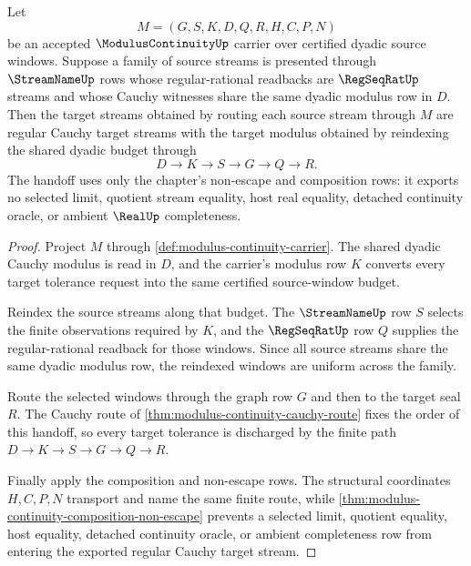 \begin{theorem}
\label{thm:modulus-continuity-uniform-cauchy-handoff}
Let
$$
M=(G,S,K,D,Q,R,H,C,P,N)
$$
be an accepted $\ModulusContinuityUp$ carrier over certified dyadic source windows. Suppose a family of source streams is presented through $\StreamNameUp$ rows whose regular-rational readbacks are $\RegSeqRatUp$ streams and whose Cauchy witnesses share the same dyadic modulus row in $D$. Then the target streams obtained by routing each source stream through $M$ are regular Cauchy target streams with the target modulus obtained by reindexing the shared dyadic budget through
$$
D \to K \to S \to G \to Q \to R .
$$
The handoff uses only the chapter's non-escape and composition rows: it exports no selected limit, quotient stream equality, host real equality, detached continuity oracle, or ambient $\RealUp$ completeness.
\end{theorem}
\begin{proof}
Project $M$ through \autoref{def:modulus-continuity-carrier}. The shared dyadic Cauchy modulus is read in $D$, and the carrier's modulus row $K$ converts every target tolerance request into the same certified source-window budget.

Reindex the source streams along that budget. The $\StreamNameUp$ row $S$ selects the finite observations required by $K$, and the $\RegSeqRatUp$ row $Q$ supplies the regular-rational readback for those windows. Since all source streams share the same dyadic modulus row, the reindexed windows are uniform across the family.

Route the selected windows through the graph row $G$ and then to the target seal $R$. The Cauchy route of \autoref{thm:modulus-continuity-cauchy-route} fixes the order of this handoff, so every target tolerance is discharged by the finite path $D \to K \to S \to G \to Q \to R$.

Finally apply the composition and non-escape rows. The structural coordinates $H,C,P,N$ transport and name the same finite route, while \autoref{thm:modulus-continuity-composition-non-escape} prevents a selected limit, quotient equality, host equality, detached continuity oracle, or ambient completeness row from entering the exported regular Cauchy target stream.
\end{proof}

